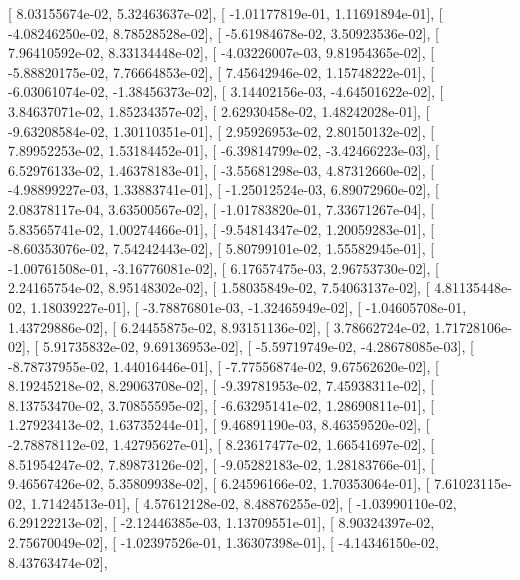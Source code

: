 \documentclass{article}
\begin{document}
       [  8.03155674e-02,   5.32463637e-02],
       [ -1.01177819e-01,   1.11691894e-01],
       [ -4.08246250e-02,   8.78528528e-02],
       [ -5.61984678e-02,   3.50923536e-02],
       [  7.96410592e-02,   8.33134448e-02],
       [ -4.03226007e-03,   9.81954365e-02],
       [ -5.88820175e-02,   7.76664853e-02],
       [  7.45642946e-02,   1.15748222e-01],
       [ -6.03061074e-02,  -1.38456373e-02],
       [  3.14402156e-03,  -4.64501622e-02],
       [  3.84637071e-02,   1.85234357e-02],
       [  2.62930458e-02,   1.48242028e-01],
       [ -9.63208584e-02,   1.30110351e-01],
       [  2.95926953e-02,   2.80150132e-02],
       [  7.89952253e-02,   1.53184452e-01],
       [ -6.39814799e-02,  -3.42466223e-03],
       [  6.52976133e-02,   1.46378183e-01],
       [ -3.55681298e-03,   4.87312660e-02],
       [ -4.98899227e-03,   1.33883741e-01],
       [ -1.25012524e-03,   6.89072960e-02],
       [  2.08378117e-04,   3.63500567e-02],
       [ -1.01783820e-01,   7.33671267e-04],
       [  5.83565741e-02,   1.00274466e-01],
       [ -9.54814347e-02,   1.20059283e-01],
       [ -8.60353076e-02,   7.54242443e-02],
       [  5.80799101e-02,   1.55582945e-01],
       [ -1.00761508e-01,  -3.16776081e-02],
       [  6.17657475e-03,   2.96753730e-02],
       [  2.24165754e-02,   8.95148302e-02],
       [  1.58035849e-02,   7.54063137e-02],
       [  4.81135448e-02,   1.18039227e-01],
       [ -3.78876801e-03,  -1.32465949e-02],
       [ -1.04605708e-01,   1.43729886e-02],
       [  6.24455875e-02,   8.93151136e-02],
       [  3.78662724e-02,   1.71728106e-02],
       [  5.91735832e-02,   9.69136953e-02],
       [ -5.59719749e-02,  -4.28678085e-03],
       [ -8.78737955e-02,   1.44016446e-01],
       [ -7.77556874e-02,   9.67562620e-02],
       [  8.19245218e-02,   8.29063708e-02],
       [ -9.39781953e-02,   7.45938311e-02],
       [  8.13753470e-02,   3.70855595e-02],
       [ -6.63295141e-02,   1.28690811e-01],
       [  1.27923413e-02,   1.63735244e-01],
       [  9.46891190e-03,   8.46359520e-02],
       [ -2.78878112e-02,   1.42795627e-01],
       [  8.23617477e-02,   1.66541697e-02],
       [  8.51954247e-02,   7.89873126e-02],
       [ -9.05282183e-02,   1.28183766e-01],
       [  9.46567426e-02,   5.35809938e-02],
       [  6.24596166e-02,   1.70353064e-01],
       [  7.61023115e-02,   1.71424513e-01],
       [  4.57612128e-02,   8.48876255e-02],
       [ -1.03990110e-02,   6.29122213e-02],
       [ -2.12446385e-03,   1.13709551e-01],
       [  8.90324397e-02,   2.75670049e-02],
       [ -1.02397526e-01,   1.36307398e-01],
       [ -4.14346150e-02,   8.43763474e-02],
\end{document}
